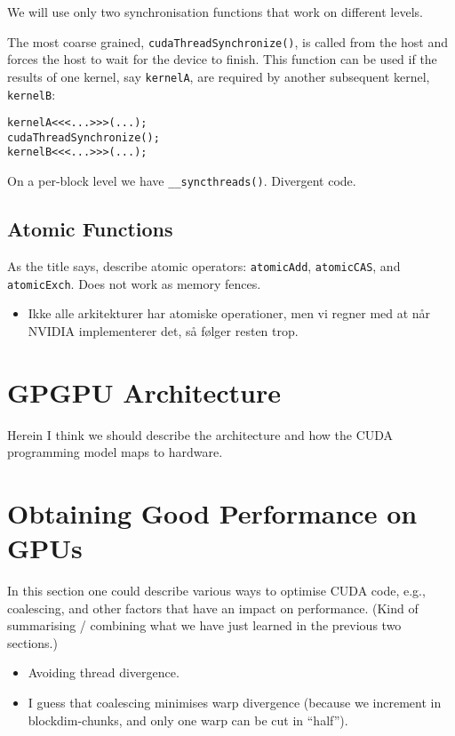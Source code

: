We will use only two synchronisation functions that work on
different levels.

The most coarse grained, \texttt{cudaThreadSynchronize()},
is called from the host and forces the host to wait for the
device to finish. This function can be used if the results
of one kernel, say \texttt{kernelA}, are required by another
subsequent kernel, \texttt{kernelB}:
%
\begin{verbatim}
kernelA<<<...>>>(...);
cudaThreadSynchronize();
kernelB<<<...>>>(...);
\end{verbatim}
%
On a per-block level we have \texttt{\_\_syncthreads()}. Divergent code.


\subsection{Atomic Functions}

As the title says, describe atomic operators:
\texttt{atomicAdd}, \texttt{atomicCAS}, and
\texttt{atomicExch}. Does not work as memory fences.
%
\begin{itemize}
  \item Ikke alle arkitekturer har atomiske operationer, men
    vi regner med at når NVIDIA implementerer det, så følger
    resten trop.
\end{itemize}
%

\section{GPGPU Architecture}
\label{sec:architecture}


Herein I think we should describe the architecture and how
the CUDA programming model maps to hardware.


\section{Obtaining Good Performance on GPUs}
\label{sec:performance_on_gpus}

In this section one could describe various ways to optimise
CUDA code, e.g., coalescing, and other factors that have an
impact on performance. (Kind of summarising / combining what
we have just learned in the previous two sections.)
%
\begin{itemize}
  \item Avoiding thread divergence.
  \item I guess that coalescing minimises warp divergence
    (because we increment in blockdim-chunks, and only one
    warp can be cut in ``half'').
\end{itemize}
%

